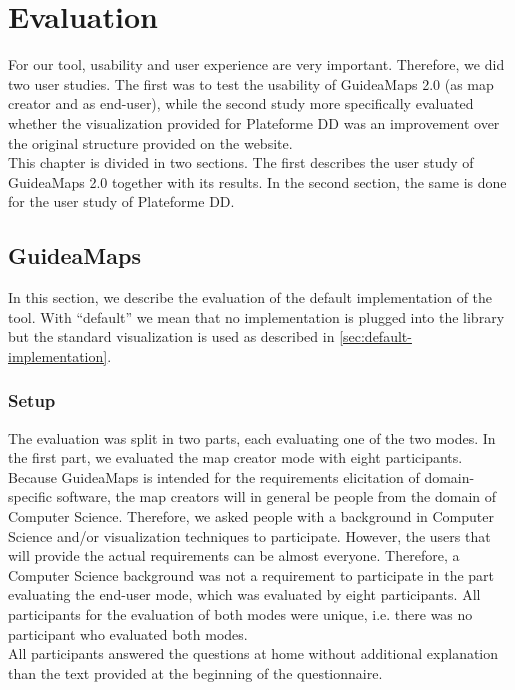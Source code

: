 \chapter{Evaluation}\label{ch:evaluation}
For our tool, usability and user experience are very important. Therefore, we did two user studies. The first was to test the usability of GuideaMaps 2.0 (as map creator and as end-user), while the second study more specifically evaluated whether the visualization provided for Plateforme DD was an improvement over the original structure provided on the website.\\

This chapter is divided in two sections. The first describes the user study of GuideaMaps 2.0 together with its results. In the second section, the same is done for the user study of Plateforme DD.





\section{GuideaMaps}
In this section, we describe the evaluation of the default implementation of the tool. With ``default'' we mean that no implementation is plugged into the library but the standard visualization is used as described in \autoref{sec:default-implementation}.

\subsection{Setup}
The evaluation was split in two parts, each evaluating one of the two modes. In the first part, we evaluated the map creator mode with eight participants. Because GuideaMaps is intended for the requirements elicitation of domain-specific software, the map creators will in general be people from the domain of Computer Science. Therefore, we asked people with a background in Computer Science and/or visualization techniques to participate. However, the users that will provide the actual requirements can be almost everyone. Therefore, a Computer Science background was not a requirement to participate in the part evaluating the end-user mode, which was evaluated by eight participants. All participants for the evaluation of both modes were unique, i.e. there was no participant who evaluated both modes.\\

All participants answered the questions at home without additional explanation than the text provided at the beginning of the questionnaire.

